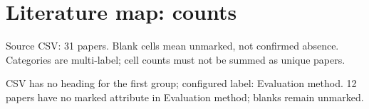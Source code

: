 \documentclass[10pt]{article}
\begin{document}
\section*{Literature map: counts}
Source CSV: 31 papers. Blank cells mean unmarked, not confirmed absence. Categories are multi-label; cell counts must not be summed as unique papers.
\par\smallskip CSV has no heading for the first group; configured label: Evaluation method. 12 papers have no marked attribute in Evaluation method; blanks remain unmarked.



\end{document}

